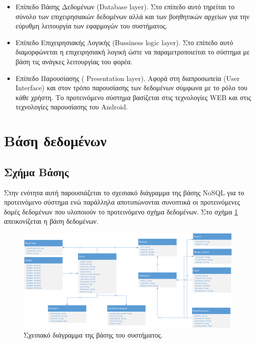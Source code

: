 	\begin{itemize}
	\item Επίπεδο Βάσης Δεδομένων (Database layer). Στο επίπεδο αυτό τηρείται το σύνολο των επιχειρησιακών δεδομένων αλλά και των βοηθητικών αρχείων για την εύρυθμη λειτουργία των εφαρμογών του συστήματος.
	
	\item  Επίπεδο Επιχειρησιακής Λογικής (Bussiness logic layer). Στο επίπεδο αυτό διαμορφώνεται η επιχειρησιακή λογική ώστε να παραμετροποιείται το σύστημα με βάση τις ανάγκες λειτουργίας του φορέα.
	
	\item Επίπεδο Παρουσίασης ( Presentation layer). Αφορά στη διαπροσωπεία (User Interface) και στον τρόπο παρουσίασης των δεδομένων σύμφωνα με το ρόλο του κάθε χρήστη. Το προτεινόμενο σύστημα βασίζεται στις τεχνολογίες WEB και στις τεχνολογίες παρουσίασης του Android.
	
	\end{itemize}

\section{Βάση δεδομένων}
	\subsection{Σχήμα Βάσης}
	
	Στην ενότητα αυτή παρουσιάζεται το σχεσιακό διάγραμμα της βάσης NoSQL για το προτεινόμενο σύστημα ενώ παράλληλα αποτυπώνονται συνοπτικά οι προτεινόμενες δομές δεδομένων που υλοποιούν το προτεινόμενο σχήμα δεδομένων. Στο σχήμα \ref{fig:database_diag} απεικονίζεται η βάση δεδομένων.
	
	\begin{figure}[H]
	    \centering
	    \includegraphics[width=1\textwidth]{Class_Diagram.png}
	    \caption{Σχεσιακό διάγραμμα της βάσης του συστήματος.}
	    \label{fig:database_diag}
	\end{figure}
	
